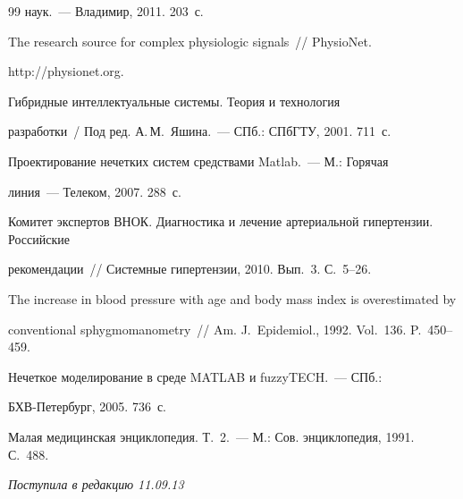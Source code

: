 {{\begin{thebibliography}{99}
наук.~--- Владимир, 2011. 203~с.




The research source for complex physiologic signals~/\!\!/ PhysioNet.


{\sf http://\linebreak physionet.org}.




 Гибридные интеллектуальные системы. Теория и технология


разработки~/ Под ред. А.\,М.~Яшина.~--- СПб.: СПбГТУ, 2001. 711~с.




 Проектирование нечетких систем средствами Matlab.~--- М.: Горячая


линия~--- Телеком, 2007. 288~с.




Комитет экспертов ВНОК. Диагностика и лечение артериальной гипертензии. Российские


рекомендации~/\!\!/ Системные гипертензии, 2010. Вып.~3. С.~5--26.




 The increase in blood pressure with age and body mass index is overestimated by


conventional sphygmomanometry~/\!\!/ Am. J.~Epidemiol., 1992. Vol.~136. P.~450--459.




 Нечеткое моделирование в среде MATLAB и fuzzyTECH.~--- СПб.:


БХВ-Петербург, 2005. 736~с.




Малая медицинская энциклопедия. Т.~2.~--- М.: Сов. энциклопедия, 1991. С.~488.


\end{thebibliography}


}


}





\hfill{\small\textit{Поступила в редакцию 11.09.13}}










